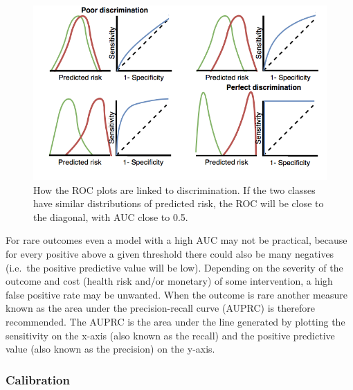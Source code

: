 \documentclass[11pt]{book}
\theoremstyle{definition}
\theoremstyle{definition}
\theoremstyle{definition}
\theoremstyle{remark}
\begin{document}
\begin{figure}
\includegraphics[width=1\linewidth]{images/PatientLevelPrediction/theory/roctheory} \caption{How the ROC plots are linked to discrimination. If the two classes have similar distributions of predicted risk, the ROC will be close to the diagonal, with AUC close to 0.5.}\label{fig:figuretheoryroctheory}
\end{figure}

For rare outcomes even a model with a high AUC may not be practical,
because for every positive above a given threshold there could also be
many negatives (i.e.~the positive predictive value will be low).
Depending on the severity of the outcome and cost (health risk and/or
monetary) of some intervention, a high false positive rate may be
unwanted. When the outcome is rare another measure known as the area
under the precision-recall curve (AUPRC) is therefore recommended. The
AUPRC is the area under the line generated by plotting the sensitivity
on the x-axis (also known as the recall) and the positive predictive
value (also known as the precision) on the y-axis.

\subsubsection*{Calibration}\label{calibration}
\end{document}
